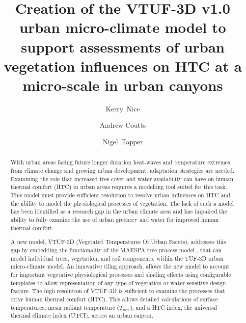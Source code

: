 \documentclass[final,3p,times,authoryear]{elsarticle}
\begin{document}
\begin{frontmatter}



\title{Creation of the VTUF-3D v1.0 urban micro-climate model to support assessments of urban vegetation influences on HTC at a micro-scale in urban canyons}


\author[monash,crc]{Kerry~Nice}
\author[monash,crc]{Andrew Coutts}
\author[monash,crc]{Nigel~Tapper}
\address[monash]{School of Earth, Atmosphere and Environment, Monash University, Australia}
\address[crc]{CRC for Water Sensitive Cities, Australia}


\begin{abstract}

With urban areas facing future longer duration heat-waves and temperature extremes from climate change and growing urban development, adaptation strategies are needed. Examining the role that increased tree cover and water availability can have on human thermal comfort (HTC) in urban areas requires a modelling tool suited for this task. This model must provide sufficient resolution to resolve urban influences on HTC and the ability to model the physiological processes of vegetation. The lack of such a model has been identified as a research gap in the urban climate area and has impaired the ability to fully examine the use of urban greenery and water for improved human thermal comfort. 

A new model, VTUF-3D (Vegetated Temperatures Of Urban Facets), addresses this gap by embedding the functionality of the MAESPA tree process model \citep{Duursma2012}, that can model individual trees, vegetation, and soil components, within the TUF-3D \citep{Krayenhoff2007} urban micro-climate model. An innovative tiling approach, allows the new model to account for important vegetative physiological processes and shading effects using configurable templates to allow representation of any type of vegetation or water sensitive design feature. The high resolution of VTUF-3D is sufficient to examine the processes that drive human thermal comfort (HTC). This allows detailed calculations of surface temperatures, mean radiant temperature ($T_{mrt}$), and a HTC index, the universal thermal climate index (UTCI), across an urban canyon. 


\end{abstract}
\end{frontmatter}
\end{document}
